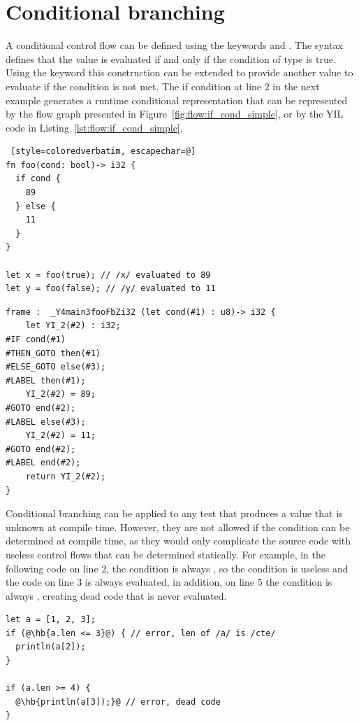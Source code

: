\section{Conditional branching}%
\label{sec:flow:if_else}

A conditional control flow can be defined using the keywords  and
. The syntax  defines that the value  is
evaluated if and only if the condition  of type  is true.
Using the keyword  this construction can be extended to provide
another value to evaluate if the condition is not met. The if condition at line
2 in the next example generates a runtime conditional representation that can be
represented by the flow graph presented in Figure~\ref{fig:flow:if_cond_simple}, or
by the YIL code in Listing~\ref{lst:flow:if_cond_simple}.

\begin{lstlisting} [style=coloredverbatim, escapechar=@]
fn foo(cond: bool)-> i32 {
  if cond {
    89
  } else {
    11
  }
}

let x = foo(true); // /x/ evaluated to 89
let y = foo(false); // /y/ evaluated to 11
\end{lstlisting}

\begin{lstlisting}[style=lyilVerb, caption=Simple condition, label=lst:flow:if_cond_simple]
frame :  _Y4main3fooFbZi32 (let cond(#1) : u8)-> i32 {
    let YI_2(#2) : i32;
#IF cond(#1)
#THEN_GOTO then(#1)
#ELSE_GOTO else(#3);
#LABEL then(#1);
    YI_2(#2) = 89;
#GOTO end(#2);
#LABEL else(#3);
    YI_2(#2) = 11;
#GOTO end(#2);
#LABEL end(#2);
    return YI_2(#2);
}
\end{lstlisting}



Conditional branching can be applied to any test that produces a 
value that is unknown at compile time. However, they are not allowed if the
condition can be determined at compile time, as they would only complicate the
source code with useless control flows that can be determined statically. For
example, in the following code on line 2, the condition is always ,
so the condition is useless and the code on line 3 is always evaluated, in
addition, on line 5 the condition is always , creating dead code
that is never evaluated.

\begin{lstlisting}[style=coloredverbatimError, escapechar=@]
let a = [1, 2, 3];
if (@\hb{a.len <= 3}@) { // error, len of /a/ is /cte/
  println(a[2]);
}

if (a.len >= 4) {
  @\hb{println(a[3]);}@ // error, dead code
}
\end{lstlisting}

